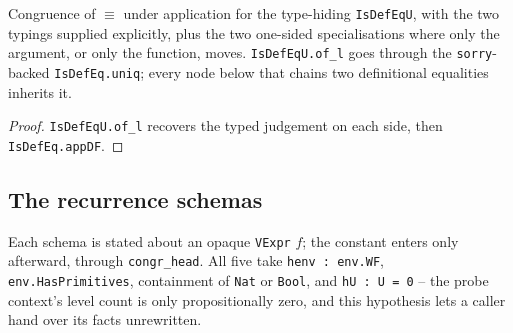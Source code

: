 \begin{lemma}
\label{vpc:lem:prim-isdefequ-app-congr}
\leanok
{}

 Congruence of $\equiv$ under application for the type-hiding
\texttt{IsDefEqU}, with the two typings supplied explicitly, plus the two one-sided
specialisations where only the argument, or only the function, moves.
 \texttt{IsDefEqU.of\_l} goes through the \texttt{sorry}-backed
\texttt{IsDefEq.uniq}; every node below that chains two definitional equalities inherits it.
\end{lemma}
\begin{proof}\leanok
{}
 \texttt{IsDefEqU.of\_l} recovers the typed judgement on each side, then
\texttt{IsDefEq.appDF}.
\end{proof}

\subsection{The recurrence schemas}

Each schema is stated about an opaque \texttt{VExpr} $f$; the constant enters only afterward,
through \texttt{congr\_head}. All five take \texttt{henv : env.WF}, \texttt{env.HasPrimitives},
containment of \texttt{Nat} or \texttt{Bool}, and \texttt{hU : U = 0} -- the probe context's
level count is only propositionally zero, and this hypothesis lets a caller hand over its facts
unrewritten.

